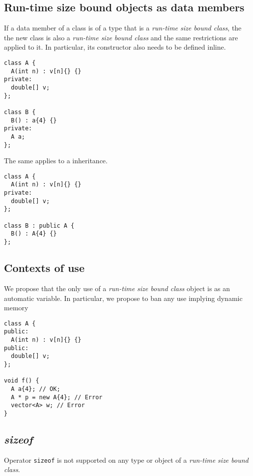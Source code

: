 \subsection{Run-time size bound objects as data members}

If a data member of a class is of a type that is a \emph{run-time size bound class}, the the new 
class is also a \emph{run-time size bound class} and the same restrictions are
applied to it. In particular, its constructor also needs to be defined inline.

\begin{lstlisting}
class A {
  A(int n) : v[n]{} {}
private:
  double[] v;
};

class B {
  B() : a{4} {}
private:
  A a;
};
\end{lstlisting}

The same applies to a inheritance.

\begin{lstlisting}
class A {
  A(int n) : v[n]{} {}
private:
  double[] v;
};

class B : public A {
  B() : A{4} {}
};
\end{lstlisting}

\subsection{Contexts of use}

We propose that the only use of a \emph{run-time size bound class} object is as
an automatic variable. In particular, we propose to ban any use implying dynamic
memory

\begin{lstlisting}
class A {
public:
  A(int n) : v[n]{} {}
public:
  double[] v;
};

void f() {
  A a{4}; // OK;
  A * p = new A{4}; // Error
  vector<A> w; // Error
}
\end{lstlisting}

\subsection{\emph{sizeof}}

Operator \verb+sizeof+ is not supported on any type or object of a \emph{run-time size bound class}.
